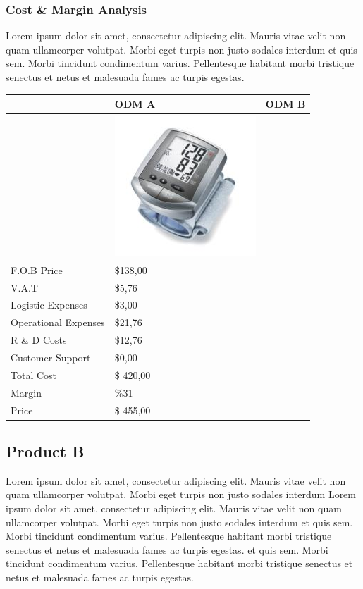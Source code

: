 \documentclass[11pt,a4paper,titlepage]{article}
\begin{document}
\subsubsection{Cost \& Margin Analysis}
Lorem ipsum dolor sit amet, consectetur adipiscing elit. Mauris vitae velit 
non quam ullamcorper volutpat. Morbi eget turpis non justo sodales interdum 
et quis sem. Morbi tincidunt condimentum varius. Pellentesque habitant morbi 
tristique senectus et netus et malesuada fames ac turpis egestas.\newline
\begin{tabular}{ | l | l | l | }\hline
  & ODM A & ODM B \\\hline
  & \includegraphics[scale=0.40,bb=0 0 150 150]{prod_bpm4.jpg} &\\\hline
  F.O.B Price & \$138,00 &\\\hline
  V.A.T & \$5,76 &\\\hline
  Logistic Expenses & \$3,00 &\\\hline
  Operational Expenses & \$21,76 &\\\hline
  R \& D Costs & \$12,76 &\\\hline
  Customer Support & \$0,00 &\\\hline
  Total Cost & \$ 420,00 &\\\hline
  Margin & \%31 &\\\hline
  Price & \$ 455,00 &\\\hline
\end{tabular}
\pagebreak

\subsection{Product B}
Lorem ipsum dolor sit amet, consectetur adipiscing elit. Mauris vitae velit 
non quam ullamcorper volutpat. Morbi eget turpis non justo sodales interdum 
Lorem ipsum dolor sit amet, consectetur adipiscing elit. Mauris vitae velit 
non quam ullamcorper volutpat. Morbi eget turpis non justo sodales interdum 
et quis sem. Morbi tincidunt condimentum varius. Pellentesque habitant morbi 
tristique senectus et netus et malesuada fames ac turpis egestas.
et quis sem. Morbi tincidunt condimentum varius. Pellentesque habitant morbi 
tristique senectus et netus et malesuada fames ac turpis egestas.\newline
\end{document}
